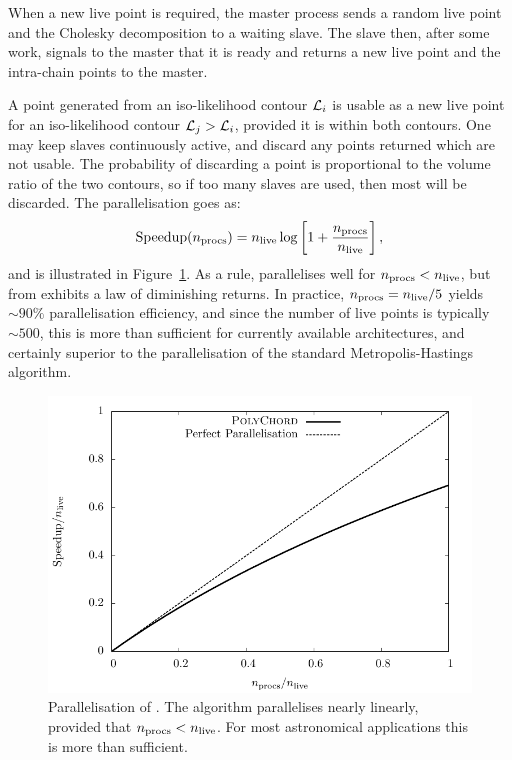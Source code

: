 When a new live point is required, the master process sends a random live point and the Cholesky decomposition to a waiting slave.  The slave then, after some work, signals to the master that it is ready and returns a new live point and the intra-chain points to the master.

A point generated from an iso-likelihood contour \(\mathcal{L}_i\) is usable as a new live point for an iso-likelihood contour \(\mathcal{L}_j>\mathcal{L}_i\), provided it is within both contours.  One may keep slaves continuously active, and discard any points returned which are not usable.  The probability of discarding a point is proportional to the volume ratio of the two contours, so if too many slaves are used, then most will be discarded.  The parallelisation goes as:
\begin{equation}
  \text{Speedup}(n_{\mathrm{procs}}) = n_{\mathrm{live}}\log\left[ 1 + \frac{n_{\mathrm{procs}}}{n_{\mathrm{live}}} \right],
  \label{eqn:pc:parallel}
\end{equation}
and is illustrated in Figure~\ref{fig:pc:parallel}. 
As a rule, \PolyChord{} parallelises well for \(n_{\mathrm{procs}}<n_{\mathrm{live}}\), but from exhibits a law of diminishing returns. In practice, \(n_{\mathrm{procs}} = n_{\mathrm{live}}/5\) yields \(\sim90\%\) parallelisation efficiency, and
since the number of live points is typically \(\sim500\), this is more than sufficient for currently available \openMPI{} architectures, and certainly superior to the parallelisation of the standard Metropolis-Hastings algorithm.
%
\begin{figure}[tp]
  \centering
  \includegraphics[width=\columnwidth]{chapters/polychord/figures/parallel}
  \caption{%
Parallelisation of \PolyChord{}. 
The algorithm parallelises nearly linearly, provided that \(n_{\mathrm{procs}}<n_{\mathrm{live}}\). For most astronomical applications this is more than sufficient.\label{fig:pc:parallel}}
\end{figure}
%
